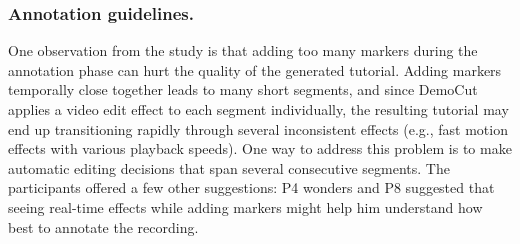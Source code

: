 \subsubsection{Annotation guidelines.} One observation from the study is that
adding too many markers during the annotation phase can hurt the
quality of the generated tutorial. Adding markers temporally close together leads to many short
segments, and since DemoCut applies a video edit effect to each segment
individually, the resulting tutorial may end up transitioning rapidly
through several inconsistent effects (e.g., fast motion effects with
various playback speeds). One way to address this problem is to make
automatic editing decisions that span several consecutive segments. The
participants offered a few other suggestions: P4 wonders  and P8 suggested that seeing
real-time effects while adding markers might help him
understand how best to annotate the recording.

